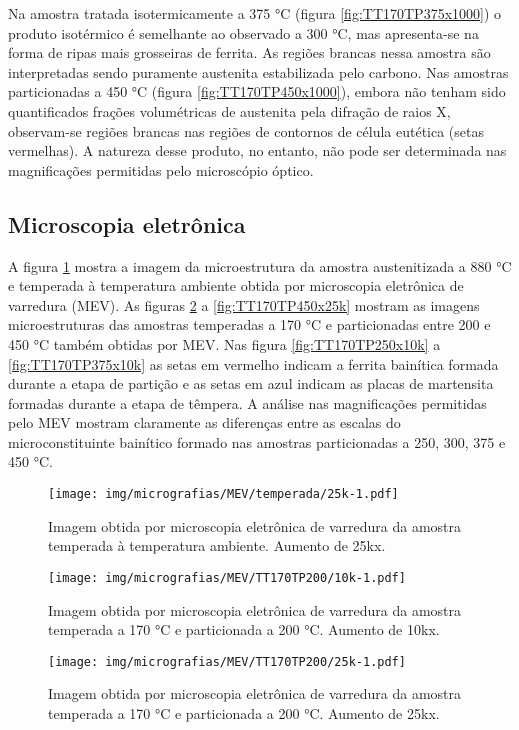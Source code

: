 Na amostra tratada isotermicamente a 375 °C (figura \ref{fig:TT170TP375x1000}) o produto isotérmico é semelhante ao observado a 300 °C, mas apresenta-se na forma de ripas mais grosseiras de ferrita. As regiões brancas nessa amostra são interpretadas sendo puramente austenita estabilizada pelo carbono. Nas amostras particionadas a 450 °C (figura \ref{fig:TT170TP450x1000}), embora não tenham sido quantificados frações volumétricas de austenita pela difração de raios X, observam-se regiões brancas nas regiões de contornos de célula eutética (setas vermelhas). A natureza desse produto, no entanto, não pode ser determinada nas magnificações permitidas pelo microscópio óptico.

\subsection{Microscopia eletrônica}

A figura \ref{fig:temperadax25k} mostra a imagem da microestrutura da amostra austenitizada a 880 °C e temperada à temperatura ambiente obtida por microscopia eletrônica de varredura (MEV). As figuras \ref{fig:TT170TP200x10k} a \ref{fig:TT170TP450x25k} mostram as imagens microestruturas das amostras temperadas a 170 °C e particionadas entre 200 e 450 °C também obtidas por MEV. Nas figura \ref{fig:TT170TP250x10k} a \ref{fig:TT170TP375x10k} as setas em vermelho indicam a ferrita bainítica formada durante a etapa de partição e as setas em azul indicam as placas de martensita formadas durante a etapa de têmpera. A análise nas magnificações permitidas pelo MEV mostram claramente as diferenças entre as escalas do microconstituinte bainítico formado nas amostras particionadas a 250, 300, 375 e 450 °C.

\begin{figure}
	\texttt{[image: img/micrografias/MEV/temperada/25k-1.pdf]}
	\caption{Imagem obtida por microscopia eletrônica de varredura da amostra temperada à temperatura ambiente. Aumento de 25kx.}
	\label{fig:temperadax25k}
\end{figure}

\begin{figure}
	\texttt{[image: img/micrografias/MEV/TT170TP200/10k-1.pdf]}
	\caption{Imagem obtida por microscopia eletrônica de varredura da amostra temperada a 170 °C e particionada a 200 °C. Aumento de 10kx.}
	\label{fig:TT170TP200x10k}
\end{figure}

\begin{figure}
	\texttt{[image: img/micrografias/MEV/TT170TP200/25k-1.pdf]}
	\caption{Imagem obtida por microscopia eletrônica de varredura da amostra temperada a 170 °C e particionada a 200 °C. Aumento de 25kx.}
	\label{fig:TT170TP200x25k}
\end{figure}

